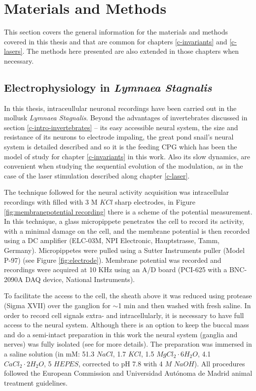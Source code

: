 \chapter{Materials and Methods}
This section covers the general information for the materials and methods covered in this thesis and that are common for chapters \ref{c-invariants} and \ref{c-lasers}. The methods here presented are also extended in those chapters when necessary.

\section{Electrophysiology in \textit{Lymnaea Stagnalis}}

\label{subsec:preparation}
In this thesis, intraceullular neuronal recordings have been carried out in the mollusk \textit{Lymnaea Stagnalis}. Beyond the advantages of invertebrates discussed in section \ref{c-intro-invertebrates} -- its easy accessible neural system, the size and resistance of its neurons to electrode impaling, the great pond snail's neural system is detailed described and so it is the feeding CPG which has been the model of study for chapter \ref{c-invariants} in this work. Also its slow dynamics, are convenient when studying the sequential evolution of the modulation, as in the case of the laser stimulation described along chapter \ref{c-laser}. 

The technique followed for the neural activity acquisition was intracellular recordings with filled with 3 M $KCl$ sharp electrodes, in Figure \ref{fig:membranepotential recording} there is a scheme of the potential measurement. In this technique, a glass micropippete penetrates the cell to record its activity, with a minimal damage on the cell, and the membrane potential is then recorded using a DC amplifier (ELC-03M, NPI Electronic, Hauptstrasse, Tamm, Germany). Micropippetes were pulled using a Sutter Instruments puller (Model P-97) (see Figure \ref{fig:electrode}). Membrane potential was recorded and recordings were acquired at 10 KHz using an A/D board (PCI-625 with a BNC-2090A DAQ device, National Instruments).

To facilitate the access to the cell, the sheath above it was reduced using protease (Sigma XVII) over the ganglion for $\sim$1 min and then washed with fresh saline. In order to record cell signals extra- and intracellularly, it is necessary to have full access to the neural system. Although there is an option to keep the buccal mass and do a semi-intact preparation \parencite{Staras1999} in this work the neural system (ganglia and nerves) was fully isolated (see \cite{garrido-pena_tfm_2022} for more details). The preparation was immersed in a saline solution (in mM: 51.3 $NaCl$, 1.7 $KCl$, 1.5 $MgCl_2\cdot6H_2O$, 4.1 $CaCl_2\cdot2H_2O$, 5 $HEPES$, corrected to pH 7.8 with 4 $M$ $NaOH$). All procedures followed the European Commission and Universidad Autónoma de Madrid animal treatment guidelines.

